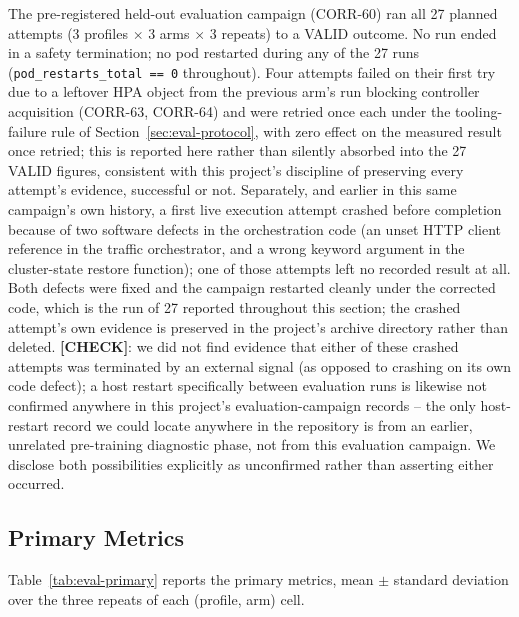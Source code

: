 The pre-registered held-out evaluation campaign (CORR-60) ran all 27
planned attempts (3 profiles $\times$ 3 arms $\times$ 3 repeats) to a
VALID outcome. No run ended in a safety termination; no pod restarted
during any of the 27 runs (\texttt{pod\_\allowbreak restarts\_\allowbreak total == 0} throughout).
Four attempts failed on their first try due to a leftover HPA object from
the previous arm's run blocking controller acquisition (CORR-63, CORR-64)
and were retried once each under the tooling-failure rule of
Section~\ref{sec:eval-protocol}, with zero effect on the measured result
once retried; this is reported here rather than silently absorbed into the
27 VALID figures, consistent with this project's discipline of preserving
every attempt's evidence, successful or not. Separately, and earlier in
this same campaign's own history, a first live execution attempt crashed
before completion because of two software defects in the orchestration
code (an unset HTTP client reference in the traffic orchestrator, and a
wrong keyword argument in the cluster-state restore function); one of
those attempts left no recorded result at all. Both defects were fixed and
the campaign restarted cleanly under the corrected code, which is the run
of 27 reported throughout this section; the crashed attempt's own evidence
is preserved in the project's archive directory rather than deleted.
\textbf{[CHECK]}: we did not find evidence that either of these crashed
attempts was terminated by an external signal (as opposed to crashing on
its own code defect); a host restart specifically between evaluation runs
is likewise not confirmed anywhere in this project's evaluation-campaign
records -- the only host-restart record we could locate anywhere in the
repository is from an earlier, unrelated pre-training diagnostic phase, not
from this evaluation campaign. We disclose both possibilities explicitly as
unconfirmed rather than asserting either occurred.

\subsection{Primary Metrics}
\label{sec:eval-primary}

Table~\ref{tab:eval-primary} reports the primary metrics, mean $\pm$
standard deviation over the three repeats of each (profile, arm) cell.

\begin{table}[H]
\centering
\caption[Held-out evaluation primary metrics]{Held-out evaluation primary metrics: SLA-violation rate at the 1000\,ms target and replica-minutes, mean $\pm$ sd over 3 repeats.}
\label{tab:eval-primary}
\small
\resizebox{\linewidth}{!}{}
\end{table}

